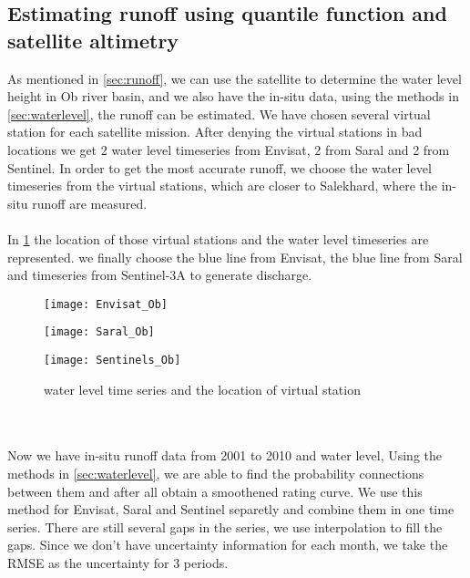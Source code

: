 \subsection{Estimating runoff using quantile function and satellite altimetry}
 As mentioned in \ref{sec:runoff}, we can use the satellite to determine the water level height in Ob river basin, and we also have the in-situ data, using the methods in \ref{sec:waterlevel}, the runoff can be estimated. We have chosen several virtual station for each satellite mission. After denying the virtual stations in bad locations we get 2 water level timeseries from Envisat, 2 from Saral and 2 from Sentinel. In order to get the most accurate runoff, we choose the water level timeseries from the virtual stations, which are closer to Salekhard, where the in-situ runoff are measured. \\\\
 In \ref{fig:waterlevel} the location of those virtual stations and the water level timeseries are represented. we finally choose the blue line from Envisat, the blue line from Saral and timeseries from Sentinel-3A to generate discharge.
 \begin{figure}[htbp]
 	\centering
 	\begin{minipage}[t]{0.7\textwidth}
 		\centering
 		\texttt{[image: Envisat\_Ob]} %
 	\end{minipage}
 	\begin{minipage}[t]{0.7\textwidth}
 		\centering
 		\texttt{[image: Saral\_Ob]} %
 	\end{minipage}
 \begin{minipage}[t]{0.7\textwidth}
 	\centering
 	\texttt{[image: Sentinels\_Ob]} %
 \end{minipage}
 \caption{water level time series and the location of virtual station}
 \label{fig:waterlevel}
 \end{figure}
\\\\
Now we have in-situ runoff data from 2001 to 2010 and water level, Using the methods in \ref{sec:waterlevel}, we are able to find the probability connections between them and after all obtain a smoothened rating curve. We use this method for Envisat, Saral and Sentinel separetly and combine them in one time series. There are still several gaps in the series, we use interpolation to fill the gaps. Since we don't have uncertainty information for each month, we take the RMSE as the uncertainty for 3 periods.  
